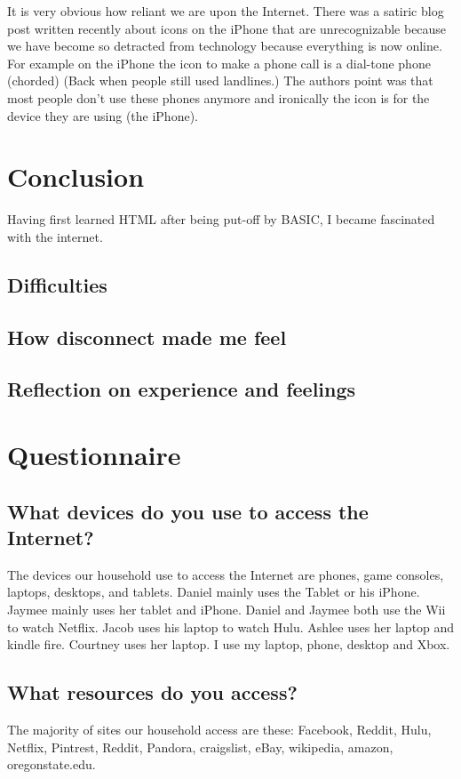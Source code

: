 \documentclass[12pt,letterpaper]{article}
\begin{document}
It is very obvious how reliant we are upon the Internet. There was a
satiric blog post written recently about icons on the iPhone that are
unrecognizable because we have become so detracted from technology
because everything is now online. For example on the iPhone the icon to
make a phone call is a dial-tone phone (chorded) (Back when people still
used landlines.)  The authors point was that most people don't use these
phones anymore and ironically the icon is for the device they are using
(the iPhone).

\section{Conclusion}

Having first learned HTML after being put-off by BASIC, I became
fascinated with the internet.

\subsection{Difficulties}
\subsection{How disconnect made me feel}
\subsection{Reflection on experience and feelings}

\section{Questionnaire}
\subsection{What devices do you use to access the Internet?}
The devices our household use to access the Internet are phones, game
consoles, laptops, desktops, and tablets. Daniel mainly uses the Tablet
or his iPhone. Jaymee mainly uses her tablet and iPhone. Daniel and
Jaymee both use the Wii to watch Netflix. Jacob uses his
laptop to watch Hulu. Ashlee uses her laptop and kindle fire. Courtney uses her
laptop. I use my laptop, phone, desktop and Xbox.

\subsection{What resources do you access?}
The majority of sites our household access are these:
Facebook, Reddit, Hulu, Netflix, Pintrest, Reddit, Pandora, craigslist,
eBay, wikipedia, amazon, oregonstate.edu.
\end{document}
